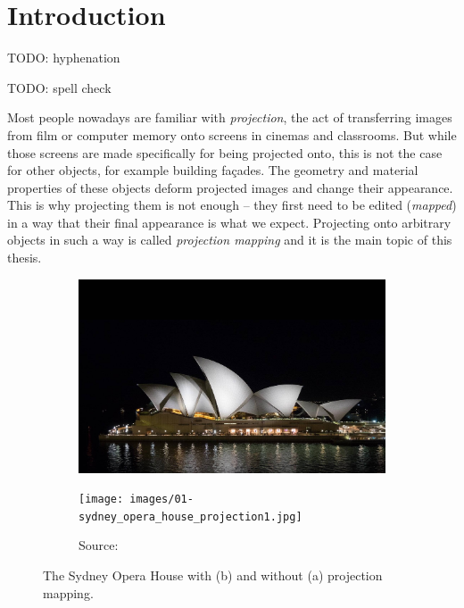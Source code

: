\chapter{Introduction}
\label{chapter:intro}

{\color{red} TODO: hyphenation}

{\color{red} TODO: spell check}

Most people nowadays are familiar with \textit{projection}, the act of transferring images from film or computer memory onto screens in cinemas and classrooms. But while those screens are made specifically for being projected onto, this is not the case for other objects, for example building façades. The geometry and material properties of these objects deform projected images and change their appearance. This is why projecting them is not enough -- they first need to be edited (\textit{mapped}) in a way that their final appearance is what we expect. Projecting onto arbitrary objects in such a way is called \textit{projection mapping} and it is the main topic of this thesis.

\begin{figure}[ht]
    \centering
    \begin{subfigure}[b]{0.49\textwidth}
        \centering
        \includegraphics[width=\textwidth]{images/01-sydney_opera_house_night-edit.jpg}
        \caption{}
    \end{subfigure}
    \hfill
    \begin{subfigure}[b]{0.49\textwidth}
        \centering
        \texttt{[image: images/01-sydney\_opera\_house\_projection1.jpg]}
        \caption{Source: \citet{ImageProjectionMappingExampleSydney}}
    \end{subfigure}
    \caption{The Sydney Opera House with (b) and without (a) projection mapping.}
    \label{fig:intro_example_sydney}
\end{figure}

